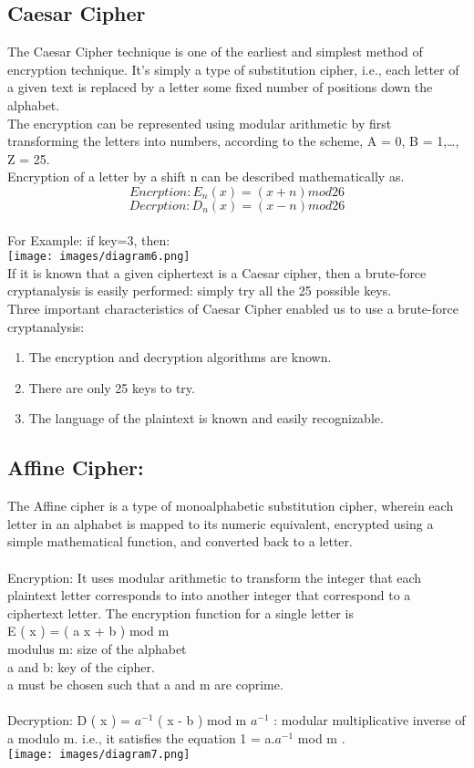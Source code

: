 \documentclass{article}
\begin{document}
\subsection{Caesar Cipher}
The Caesar Cipher technique is one of the earliest and simplest method of encryption technique. It’s simply a type of substitution cipher, i.e., each letter of a given text is replaced by a letter some fixed number of positions down the alphabet.\\
The encryption can be represented using modular arithmetic by first transforming the letters into numbers, according to the scheme, A = 0, B = 1,…, Z = 25.
\\ Encryption of a letter by a shift n can be described mathematically as.
$$Encrption: E_n(x)=(x+n)mod 26$$
$$Decrption: D_n(x)=(x-n)mod 26$$
\\For Example: if key=3, then:\\
\texttt{[image: images/diagram6.png]}
\\ If it is known that a given ciphertext is a Caesar cipher, then a brute-force cryptanalysis is easily performed: simply try all the 25 possible keys.\\
Three important characteristics of Caesar Cipher enabled us to use a brute-force cryptanalysis:
\begin{enumerate}
    \item The encryption and decryption algorithms are known.
    \item There are only 25 keys to try.
    \item The language of the plaintext is known and easily recognizable.
\end{enumerate}
\subsection{Affine Cipher:}
The Affine cipher is a type of monoalphabetic substitution cipher, wherein each letter in an alphabet is mapped to its numeric equivalent, encrypted using a simple mathematical function, and converted back to a letter.\\
\\ Encryption: It uses modular arithmetic to transform the integer that each plaintext letter corresponds to into another integer that correspond to a ciphertext letter. The encryption function for a single letter is\\
E ( x ) = ( a x + b ) mod m \\
modulus m: size of the alphabet\\
a and b: key of the cipher.\\
a must be chosen such that a and m are coprime.\\
\\ Decryption: D ( x ) = $a^{-1}$ ( x - b ) mod m
$a^{-1}$ : modular multiplicative inverse of a modulo m. i.e., it satisfies the equation 1 = a.$a^{-1}$ mod m .\\
\texttt{[image: images/diagram7.png]}
\end{document}
